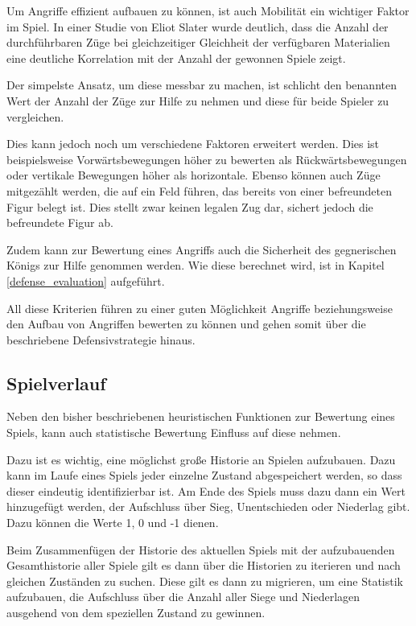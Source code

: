 
Um Angriffe effizient aufbauen zu können, ist auch Mobilität ein wichtiger Faktor im Spiel. In einer Studie von Eliot Slater wurde deutlich, dass die Anzahl der durchführbaren Züge bei gleichzeitiger Gleichheit der verfügbaren Materialien eine deutliche Korrelation mit der Anzahl der gewonnen Spiele zeigt. \cite{Slater1988}

Der simpelste Ansatz, um diese messbar zu machen, ist schlicht den benannten Wert der Anzahl der Züge zur Hilfe zu nehmen und diese für beide Spieler zu vergleichen.

Dies kann jedoch noch um verschiedene Faktoren erweitert werden. Dies ist beispielsweise Vorwärtsbewegungen höher zu bewerten als Rückwärtsbewegungen oder vertikale Bewegungen höher als horizontale. Ebenso können auch Züge mitgezählt werden, die auf ein Feld führen, das bereits von einer befreundeten Figur belegt ist. Dies stellt zwar keinen legalen Zug dar, sichert jedoch die befreundete Figur ab. \cite{O.V:2019}


Zudem kann zur Bewertung eines Angriffs auch die Sicherheit des gegnerischen Königs zur Hilfe genommen werden. Wie diese berechnet wird, ist in Kapitel \ref{defense_evaluation} aufgeführt.

All diese Kriterien führen zu einer guten Möglichkeit Angriffe beziehungsweise den Aufbau von Angriffen bewerten zu können und gehen somit über die beschriebene Defensivstrategie hinaus.


\subsection{Spielverlauf}\label{history_evaluation}

Neben den bisher beschriebenen heuristischen Funktionen zur Bewertung eines Spiels, kann auch statistische Bewertung Einfluss auf diese nehmen.

Dazu ist es wichtig, eine möglichst große Historie an Spielen aufzubauen. Dazu kann im Laufe eines Spiels jeder einzelne Zustand abgespeichert werden, so dass dieser eindeutig identifizierbar ist. Am Ende des Spiels muss dazu dann ein Wert hinzugefügt werden, der Aufschluss über Sieg, Unentschieden oder Niederlag gibt. Dazu können die Werte 1, 0 und -1 dienen.

Beim Zusammenfügen der Historie des aktuellen Spiels mit der aufzubauenden Gesamthistorie aller Spiele gilt es dann über die Historien zu iterieren und nach gleichen Zuständen zu suchen. Diese gilt es dann zu migrieren, um eine Statistik aufzubauen, die Aufschluss über die Anzahl aller Siege und Niederlagen ausgehend von dem speziellen Zustand zu gewinnen.

